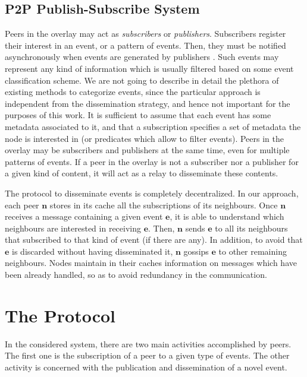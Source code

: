 \documentclass[10pt, conference, compsocconf]{IEEEtran}
\begin{document}
\subsection{P2P Publish-Subscribe System}

Peers in the overlay may act as \emph{subscribers} or \emph{publishers}. Subscribers register their interest in an event, or a pattern of events. Then, they must be notified asynchronously when events are generated by publishers \cite{Eugster:2003}. Such events may represent any kind of information which is usually filtered based on some event classification scheme. We are not going to describe in detail the plethora of existing methods to categorize events, since the particular approach is independent from the dissemination strategy, and hence not important for the purposes of this work. 
It is sufficient to assume that each event has some metadata associated to it, and that a subscription specifies a set of metadata the node is interested in (or predicates which allow to filter events).
Peers in the overlay may be subscribers and publishers at the same time, even for multiple patterns of events. If a peer in the overlay is not a subscriber nor a publisher for a given kind of content, it will act as a relay to disseminate these contents.

The protocol to disseminate events is completely decentralized. 
In our approach, each peer $\mathbf{n}$ stores in its cache all the subscriptions of its neighbours. Once $\mathbf{n}$ receives a message containing a given event $\mathbf{e}$, it is able to understand which neighbours are interested in receiving $\mathbf{e}$. Then, $\mathbf{n}$ sends $\mathbf{e}$ to all its neighbours that subscribed to that kind of event (if there are any). In addition, to avoid that $\mathbf{e}$ is discarded without having disseminated it, $\mathbf{n}$ gossips $\mathbf{e}$ to other remaining neighbours.
Nodes maintain in their caches information on messages which have been already handled, so as to avoid redundancy in the communication. 


\section{The Protocol}\label{sec:protocol}

In the considered system, there are two main activities accomplished by peers. The first one is the subscription of a peer to a given type of events. The other activity is concerned with the publication and dissemination of a novel event. 
\end{document}

